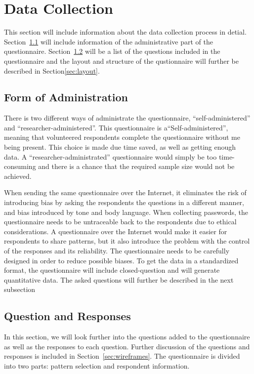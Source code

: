 \section{Data Collection} \label{sec:datacollection}
  
  This section will include information about the data collection process in detial. Section~\ref{sec:formodadministration} will include information of the administrative part of the questionnaire. Section~\ref{sec:questions} will be a list of the questions included in the questionnaire and the layout and structure of the qustionnaire will further be described in Section\ref{sec:layout}.

  \subsection{Form of Administration} \label{sec:formodadministration}

  There is two different ways of administrate the questionnaire, ``self-administered'' and ``researcher-administered''. This questionnaire is a``Self-administered'', meaning that volunteered respondents complete the questionnaire without me being present. This choice is made due time saved, as well as getting enough data. A ``researcher-administrated'' questionnaire would simply be too time-consuming and there is a chance that the required sample size would not be achieved. 
    
  When sending the same questionnaire over the Internet, it eliminates the risk of introducing bias by asking the respondents the questions in a different manner, and bias introduced by tone and body language. When collecting passwords, the questionnaire needs to be untraceable back to the respondents due to ethical considerations. A questionnaire over the Internet would make it easier for respondents to share patterns, but it also introduce the problem with the control of the responses and its reliability. The questionnaire needs to be carefully designed in order to reduce possible biases. To get the data in a standardized format, the questionnaire will include closed-question and will generate quantitative data. The asked questions will further be described in the next subsection

  \subsection{Question and Responses}\label{sec:questions}

  In this section, we will look further into the questions added to the questionnaire as well as the responses to each question. Further discussion of the questions and responses is included in Section~\ref{sec:wireframes}.
  The questionnaire is divided into two parts: pattern selection and respondent information. 

